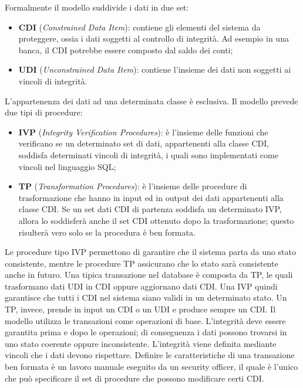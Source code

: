 Formalmente il modello suddivide i dati in due set:

\begin{itemize}
      \item \textbf{CDI} (\textit{Constrained Data Item}): contiene gli elementi
            del sistema da proteggere, ossia i dati
            soggetti al controllo di integrità. Ad esempio in una banca, il CDI
            potrebbe essere composto
            dal saldo dei conti;
      \item \textbf{UDI} (\textit{Unconstrained Data Item}): contiene l’insieme
            dei dati non soggetti ai vincoli di
            integrità.
\end{itemize}

L’appartenenza dei dati ad una determinata classe è esclusiva.
Il modello prevede due tipi di procedure:

\begin{itemize}
      \item \textbf{IVP} (\textit{Integrity Verification Procedures}): è
            l’insieme delle funzioni che verificano se un
            determinato set di dati, appartenenti alla classe CDI, soddisfa
            determinati vincoli di
            integrità, i quali sono implementati come vincoli nel linguaggio SQL;
      \item \textbf{TP} (\textit{Transformation Procedures}): è l’insieme delle
            procedure di trasformazione che hanno in input
            ed in output dei dati appartenenti alla classe CDI. Se un set dati
            CDI di partenza soddisfa
            un determinato IVP, allora lo soddisferà anche il set CDI ottenuto
            dopo la trasformazione;
            questo risulterà vero solo se la procedura è ben formata.
\end{itemize}

Le procedure tipo IVP permettono di garantire che il sistema parta da uno stato
consistente,
mentre le procedure TP assicurano che lo stato sarà consistente anche in futuro.
Una tipica
transazione nel database è composta da TP, le quali trasformano dati UDI in CDI
oppure
aggiornano dati CDI.
Una IVP quindi garantisce che tutti i CDI nel sistema siano validi in un
determinato stato. Un TP,
invece, prende in input un CDI o un UDI e produce sempre un CDI.
Il modello utilizza le transazioni come operazioni di base. L’integrità deve
essere garantita prima e
dopo le operazioni; di conseguenza i dati possono trovarsi in uno stato coerente
oppure
inconsistente. L’integrità viene definita mediante vincoli che i dati devono
rispettare.
Definire le caratteristiche di una transazione ben formata è un lavoro manuale
eseguito da un
security officer, il quale è l’unico che può specificare il set di procedure che
possono modificare
certi CDI.

